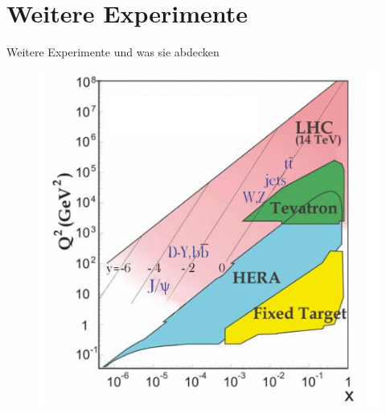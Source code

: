 \documentclass[aspectratio=1610, 9pt]{beamer}
\begin{document}
\section{Weitere Experimente}
\begin{frame}{Weitere Experimente und was sie abdecken}
  \begin{figure}
    \centering
    \includegraphics[scale=0.35]{images/Experimente.png}
  \end{figure}
\end{frame}
\end{document}
